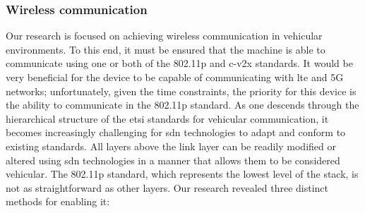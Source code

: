 \subsubsection{Wireless communication}
Our research is focused on achieving wireless communication in vehicular environments. To this end, it must be ensured that the machine is able to communicate using one or both of the 802.11p and \gls{c-v2x} standards. It would be very beneficial for the device to be capable of communicating with \gls{lte} and 5G networks; unfortunately, given the time constraints, the priority for this device is the ability to communicate in the 802.11p standard.
As one descends through the hierarchical structure of the \gls{etsi} standards for vehicular communication, it becomes increasingly challenging for \gls{sdn} technologies to adapt and conform to existing standards. All layers above the link layer can be readily modified or altered using \gls{sdn} technologies in a manner that allows them to be considered vehicular. The 802.11p standard, which represents the lowest level of the stack, is not as straightforward as other layers. Our research revealed three distinct methods for enabling it:
